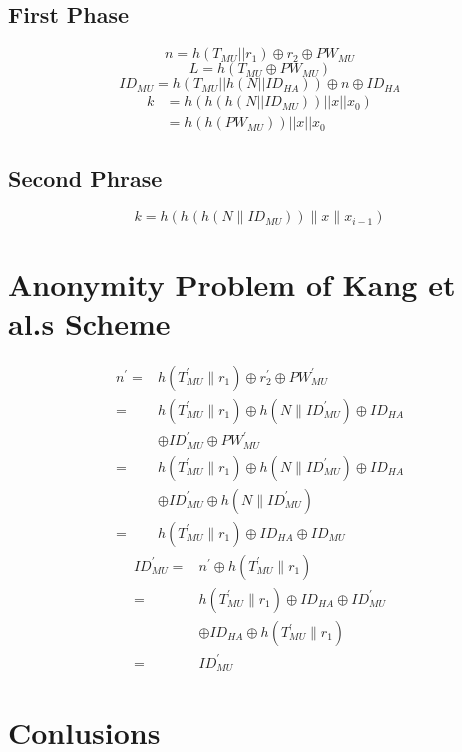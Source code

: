 \documentclass{article}
\begin{document}
\subsection{First Phase}
    \begin{equation}
        n = h(T_{MU}||r_{1}) \oplus r_{2} \oplus PW_{MU}
    \end{equation}
    \begin{equation}
        L = h(T_{MU} \oplus PW_{MU})
    \end{equation}
    \begin{equation}
        ID_{MU} = h(T_{MU}||h(N|| ID_{HA}))\oplus n \oplus ID_{HA}
    \end{equation}    
   \begin{equation}
    \begin{aligned}
        k & = h(h(h(N||ID_{MU}))||x||x_{0}) \\
          & = h(h(PW_{MU}))||x||x_{0}
    \end{aligned}         
    \end{equation}
\subsection{Second Phrase}
\begin{equation}
    k=h\left(h\left(h\left(N \| I D_{M U}\right)\right)\|x\| x_{i-1}\right)
\end{equation}
\section {Anonymity Problem of Kang et al.s Scheme}
\begin{equation}
    \begin{aligned}
        n^{\prime}=& h\left(T_{M U}^{\prime} \| r_{1}\right) \oplus r_{2}^{\prime} \oplus P W_{M U}^{\prime} \\
        =& h\left(T_{M U}^{\prime} \| r_{1}\right) \oplus h\left(N \| I D_{M U}^{\prime}\right) \oplus I D_{H A} \\
        & \oplus I D_{M U}^{\prime} \oplus P W_{M U}^{\prime} \\
        =& h\left(T_{M U}^{\prime} \| r_{1}\right) \oplus h\left(N \| I D_{M U}^{\prime}\right) \oplus I D_{H A} \\
        & \oplus I D_{M U}^{\prime} \oplus h\left(N \| I D_{M U}^{\prime}\right) \\
        =& h\left(T_{M U}^{\prime} \| r_{1}\right) \oplus I D_{H A} \oplus I D_{M U}
        \end{aligned}
\end{equation}
\begin{equation}
    \begin{aligned}
        I D_{M U}^{\prime}=& n^{\prime} \oplus h\left(T_{M U}^{\prime} \| r_{1}\right) \\
        =& h\left(T_{M U}^{\prime} \| r_{1}\right) \oplus I D_{H A} \oplus I D_{M U}^{\prime} \\
        & \oplus I D_{H A} \oplus h\left(T_{M U}^{\prime} \| r_{1}\right) \\
        =& I D_{M U}^{\prime}
        \end{aligned}
\end{equation}
\section {Conlusions}
\end{document}

